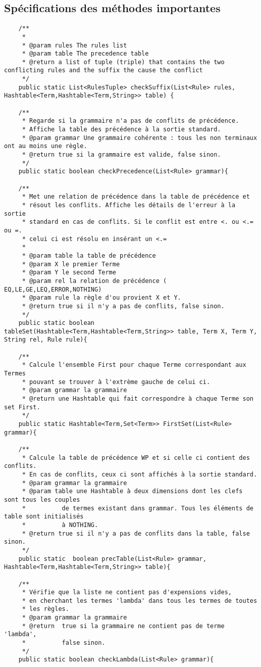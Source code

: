 	\subsection{Spécifications des méthodes importantes}
\begin{verbatim}
 	/**
	 * 
	 * @param rules The rules list
	 * @param table The precedence table
	 * @return a list of tuple (triple) that contains the two conflicting rules and the suffix the cause the conflict
	 */
	public static List<RulesTuple> checkSuffix(List<Rule> rules, Hashtable<Term,Hashtable<Term,String>> table) {
	
	/**
	 * Regarde si la grammaire n'a pas de conflits de précédence.
	 * Affiche la table des précédence à la sortie standard.
	 * @param grammar Une grammaire cohérente : tous les non terminaux ont au moins une règle. 
	 * @return true si la grammaire est valide, false sinon.
	 */
	public static boolean checkPrecedence(List<Rule> grammar){
	
	/**
	 * Met une relation de précédence dans la table de précédence et
	 * résout les conflits. Affiche les détails de l'erreur à la sortie
	 * standard en cas de conflits. Si le conflit est entre <. ou <.= ou =. 
	 * celui ci est résolu en insérant un <.= 
	 * 
	 * @param table la table de précédence
	 * @param X	le premier Terme
	 * @param Y le second Terme
	 * @param rel la relation de précédence ( EQ,LE,GE,LEQ,ERROR,NOTHING)
	 * @param rule la règle d'ou provient X et Y.
	 * @return true si il n'y a pas de conflits, false sinon. 
	 */
	public static boolean tableSet(Hashtable<Term,Hashtable<Term,String>> table, Term X, Term Y, String rel, Rule rule){
	
	/**
	 * Calcule l'ensemble First pour chaque Terme correspondant aux Termes
	 * pouvant se trouver à l'extrème gauche de celui ci. 
	 * @param grammar la grammaire
	 * @return une Hashtable qui fait correspondre à chaque Terme son set First.
	 */
	public static Hashtable<Term,Set<Term>> FirstSet(List<Rule> grammar){
	
	/**
	 * Calcule la table de précédence WP et si celle ci contient des conflits.
	 * En cas de conflits, ceux ci sont affichés à la sortie standard.
	 * @param grammar la grammaire
	 * @param table une Hashtable à deux dimensions dont les clefs sont tous les couples
	 * 			de termes existant dans grammar. Tous les éléments de table sont initialisés
	 * 			à NOTHING.
	 * @return true si il n'y a pas de conflits dans la table, false sinon. 
	 */
	public static  boolean precTable(List<Rule> grammar, Hashtable<Term,Hashtable<Term,String>> table){
	
	/**
	 * Vérifie que la liste ne contient pas d'expensions vides,
	 * en cherchant les termes 'lambda' dans tous les termes de toutes
	 * les règles. 
	 * @param grammar la grammaire
	 * @return  true si la grammaire ne contient pas de terme 'lambda',
	 * 			false sinon.
	 */
	public static boolean checkLambda(List<Rule> grammar){


\end{verbatim}

